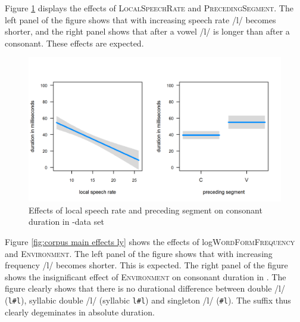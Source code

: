 \clearpage

Figure \ref{fig:corpus covariates ly} displays the effects of \textsc{LocalSpeechRate} and \textsc{PrecedingSegment}. The left panel of the figure shows that with increasing speech rate /l/ becomes shorter, and the right panel shows that after a vowel /l/ is longer than after a consonant. These effects are expected.





\begin{figure} [h!]
	\centering
		\vspace*{-0.5cm}
	\includegraphics[scale=.8] {images/Corpus/lyModelcov.png}
	\caption{Effects of local speech rate and preceding segment on consonant duration in -data set}
	\label{fig:corpus covariates ly}
\end{figure}





Figure \ref{fig:corpus main effects  ly} shows the effects of log\textsc{WordFormFrequency} and \textsc{Environment}.
The left panel of the figure shows that with increasing frequency /l/ becomes shorter. This is expected.
The right panel of the figure shows the insignificant effect of \textsc{Environment} on consonant duration in . The figure clearly shows that there is no durational difference between double /l/ (\texttt{l\#l}), syllabic double /l/ (syllabic \texttt{l\#l}) and singleton /l/ (\texttt{\#l}). The suffix  thus clearly degeminates in absolute duration. 


